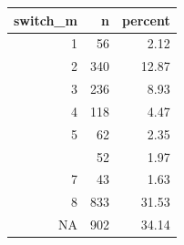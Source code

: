 
\begin{tabular}{rrr}
\toprule
switch\_m & n & percent\\
\midrule
1 & 56 & 2.12\\
2 & 340 & 12.87\\
3 & 236 & 8.93\\
4 & 118 & 4.47\\
5 & 62 & 2.35\\
\addlinespace
6 & 52 & 1.97\\
7 & 43 & 1.63\\
8 & 833 & 31.53\\
NA & 902 & 34.14\\
\bottomrule
\end{tabular}
